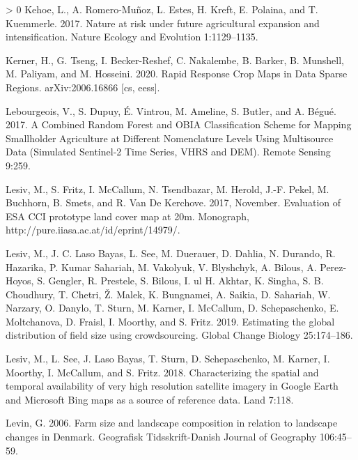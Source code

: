 \documentclass[11pt,a4paper]{article}
\newlength{\cslhangindent}
\newenvironment{CSLReferences}[3] %
 {%
  \setlength{\parindent}{0pt}
  \ifodd #1 \everypar{\setlength{\hangindent}{\cslhangindent}}\ignorespaces\fi
  \ifnum #2 > 0
  \setlength{\parskip}{#2\baselineskip}
  \fi
 }%
 {}
\begin{document}
\begin{CSLReferences}{1}{0}
\leavevmode\hypertarget{ref-kehoeNatureRiskFuture2017}{}%
Kehoe, L., A. Romero-Muñoz, L. Estes, H. Kreft, E. Polaina, and T.
Kuemmerle. 2017. Nature at risk under future agricultural expansion and
intensification. Nature Ecology and Evolution 1:1129--1135.

\leavevmode\hypertarget{ref-kernerRapidResponseCrop2020}{}%
Kerner, H., G. Tseng, I. Becker-Reshef, C. Nakalembe, B. Barker, B.
Munshell, M. Paliyam, and M. Hosseini. 2020. Rapid {Response Crop Maps}
in {Data Sparse Regions}. arXiv:2006.16866 {[}cs, eess{]}.

\leavevmode\hypertarget{ref-lebourgeoisCombinedRandomForest2017}{}%
Lebourgeois, V., S. Dupuy, É. Vintrou, M. Ameline, S. Butler, and A.
Bégué. 2017. A {Combined Random Forest} and {OBIA Classification Scheme}
for {Mapping Smallholder Agriculture} at {Different Nomenclature Levels
Using Multisource Data} ({Simulated Sentinel}-2 {Time Series}, {VHRS}
and {DEM}). Remote Sensing 9:259.

\leavevmode\hypertarget{ref-LesivEvaluationESACCI2017}{}%
Lesiv, M., S. Fritz, I. McCallum, N. Tsendbazar, M. Herold, J.-F. Pekel,
M. Buchhorn, B. Smets, and R. Van De Kerchove. 2017, November.
Evaluation of {ESA CCI} prototype land cover map at 20m. Monograph,
http://pure.iiasa.ac.at/id/eprint/14979/.

\leavevmode\hypertarget{ref-lesivEstimatingGlobalDistribution2019}{}%
Lesiv, M., J. C. Laso Bayas, L. See, M. Duerauer, D. Dahlia, N. Durando,
R. Hazarika, P. Kumar Sahariah, M. Vakolyuk, V. Blyshchyk, A. Bilous, A.
Perez-Hoyos, S. Gengler, R. Prestele, S. Bilous, I. ul H. Akhtar, K.
Singha, S. B. Choudhury, T. Chetri, Ž. Malek, K. Bungnamei, A. Saikia,
D. Sahariah, W. Narzary, O. Danylo, T. Sturn, M. Karner, I. McCallum, D.
Schepaschenko, E. Moltchanova, D. Fraisl, I. Moorthy, and S. Fritz.
2019. Estimating the global distribution of field size using
crowdsourcing. Global Change Biology 25:174--186.

\leavevmode\hypertarget{ref-LesivCharacterizingspatialtemporal2018}{}%
Lesiv, M., L. See, J. Laso Bayas, T. Sturn, D. Schepaschenko, M. Karner,
I. Moorthy, I. McCallum, and S. Fritz. 2018. Characterizing the spatial
and temporal availability of very high resolution satellite imagery in
{Google Earth} and {Microsoft Bing} maps as a source of reference data.
Land 7:118.

\leavevmode\hypertarget{ref-levinFarmSizeLandscape2006}{}%
Levin, G. 2006. Farm size and landscape composition in relation to
landscape changes in {Denmark}. Geografisk Tidsskrift-Danish Journal of
Geography 106:45--59.


\end{CSLReferences}
\end{document}

